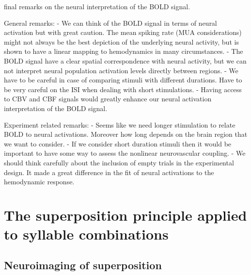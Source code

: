  final remarks on the neural interpretation of the BOLD signal.

General remarks:
- We can think of the BOLD signal in terms of neural activation but with great caution. The mean spiking rate (MUA considerations) might not always be the best depiction of the underlying neural activity, but is shown to have a linear mapping to hemodynamics in many circumstances.
- The BOLD signal have a clear spatial correspondence with neural activity, but we can not interpret neural population activation levels directly between regions.
- We have to be careful in case of comparing stimuli with different durations. Have to be very careful on the ISI when dealing with short stimulations.
- Having access to CBV and CBF signals would greatly enhance our neural activation interpretation of the BOLD signal.

Experiment related remarks:
- Seems like we need longer stimulation to relate BOLD to neural activations. Moreover how long depends on the brain region that we want to consider.
- If we consider short duration stimuli then it would be important to have some way to assess the nonlinear neurovascular coupling.
- We should think carefully about the inclusion of empty trials in the experimental design. It made a great difference in the fit of neural activations to the hemodynamic response.







\section{The superposition principle applied to syllable combinations}

\subsection{Neuroimaging of superposition}



